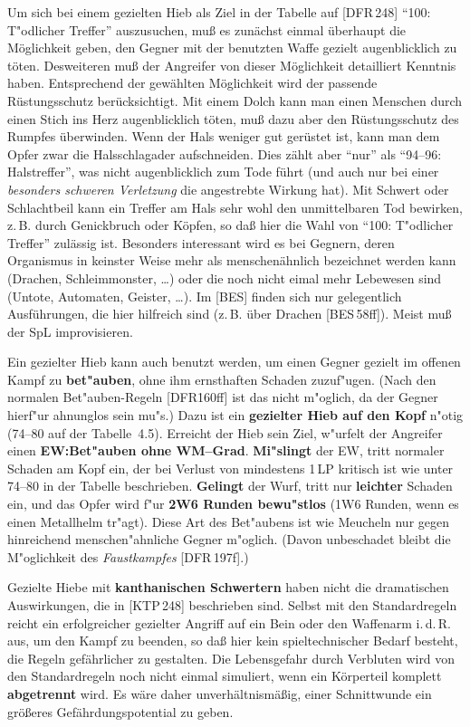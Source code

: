 \documentclass[10pt,a4paper,germanpar]{article}
\begin{document}
Um sich bei einem gezielten Hieb als Ziel in der Tabelle auf
[DFR\,248] "`100: T"odlicher Treffer"' auszusuchen, muß es zunächst
einmal überhaupt die Möglichkeit geben, den Gegner mit der benutzten
Waffe gezielt augenblicklich zu töten. Desweiteren muß der Angreifer
von dieser Möglichkeit detailliert Kenntnis haben. Entsprechend der
gewählten Möglichkeit wird der passende Rüstungsschutz
berücksichtigt. Mit einem Dolch kann man einen Menschen durch einen
Stich ins Herz augenblicklich töten, muß dazu aber den Rüstungsschutz
des Rumpfes überwinden. Wenn der Hals weniger gut gerüstet ist, kann
man dem Opfer zwar die Halsschlagader aufschneiden. Dies zählt aber
"`nur"' als "`94--96: Halstreffer"', was nicht augenblicklich zum Tode
führt (und auch nur bei einer \emph{besonders schweren Verletzung} die
angestrebte Wirkung hat). Mit Schwert oder Schlachtbeil kann ein
Treffer am Hals sehr wohl den unmittelbaren Tod bewirken, z.\,B. durch
Genickbruch oder Köpfen, so daß hier die Wahl von "`100: T"odlicher
Treffer"' zulässig ist. Besonders interessant wird es bei Gegnern,
deren Organismus in keinster Weise mehr als menschenähnlich bezeichnet
werden kann (Drachen, Schleimmonster, \dots) oder die noch nicht eimal
mehr Lebewesen sind (Untote, Automaten, Geister, \dots). Im [BES]
finden sich nur gelegentlich Ausführungen, die hier hilfreich sind
(z.\,B. über Drachen [BES\,58ff]). Meist muß der SpL improvisieren.

Ein gezielter Hieb kann auch benutzt werden, um einen Gegner gezielt
im offenen Kampf zu \textbf{bet"auben}, ohne ihm ernsthaften Schaden
zuzuf"ugen. (Nach den normalen Bet"auben-Regeln [DFR\.160ff] ist das
nicht m"oglich, da der Gegner hierf"ur ahnunglos sein mu"s.) Dazu ist
ein \textbf{gezielter Hieb auf den Kopf} n"otig (74--80 auf der
Tabelle~4.5). Erreicht der Hieb sein Ziel, w"urfelt der Angreifer einen
\textbf{EW:Bet"auben ohne WM--Grad}. \textbf{Mi"slingt} der EW, tritt
normaler Schaden am Kopf ein, der bei Verlust von mindestens 1\,LP
kritisch ist wie unter 74--80 in der Tabelle
beschrieben. \textbf{Gelingt} der Wurf, tritt nur \textbf{leichter}
Schaden ein, und das Opfer wird f"ur \textbf{2W6 Runden bewu"stlos}
(1W6 Runden, wenn es einen Metallhelm tr"agt). Diese Art des
Bet"aubens ist wie Meucheln nur gegen hinreichend menschen"ahnliche
Gegner m"oglich. (Davon unbeschadet bleibt die M"oglichkeit des
\emph{Faustkampfes} [DFR\,197f].)

Gezielte Hiebe mit \textbf{kanthanischen Schwertern} haben nicht die
dramatischen Auswirkungen, die in [KTP\,248] beschrieben sind. Selbst
mit den Standardregeln reicht ein erfolgreicher gezielter Angriff auf
ein Bein oder den Waffenarm i.\,d.\,R. aus, um den Kampf zu beenden,
so daß hier kein spieltechnischer Bedarf besteht, die Regeln
gefährlicher zu gestalten. Die Lebensgefahr durch Verbluten wird von
den Standardregeln noch nicht einmal simuliert, wenn ein Körperteil
komplett \textbf{abgetrennt} wird. Es wäre daher unverhältnismäßig,
einer Schnittwunde ein größeres Gefährdungspotential zu geben.
\end{document}
